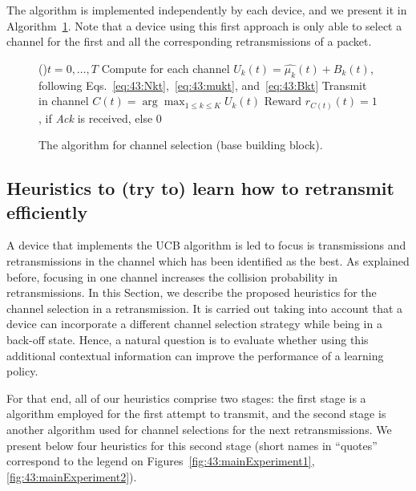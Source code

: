 The \UCB{} algorithm is implemented independently by each device, and we present it in Algorithm~\ref{algo:43:UCB}.
Note that a device using this first approach is only able to select a channel for the first and all the corresponding retransmissions of a packet.

\begin{figure}[h!]
	\centering
	\begin{algorithm}[H]
		\For(){$t = 0, \dots, T$}{
			Compute for each channel $ U_k(t) = \widehat{\mu_k}(t) + B_k(t)$, following Eqs.~\eqref{eq:43:Nkt},~\eqref{eq:43:mukt}, and~\eqref{eq:43:Bkt}\;
			Transmit in channel $C(t) = \arg\max_{1\leq k \leq K} U_k(t)$\;
			Reward $r_{C(t)}(t) = 1$, if \emph{Ack} is received, else $0$\;
		}
		\caption{The \UCB{} algorithm for channel selection (base building block).}
		\label{algo:43:UCB}
	\end{algorithm}
\end{figure}


\subsection{Heuristics to (try to) learn how to retransmit efficiently}
\label{sub:43:heuristics}

A device that implements the UCB algorithm is led to focus is transmissions and retransmissions in the channel which has been identified as the best.
As explained before, focusing in one channel increases the collision probability in retransmissions.
In this Section, we describe the proposed heuristics for the channel selection in a retransmission. It is carried out taking
into account that a device can incorporate a different channel selection strategy while being in a back-off state.
Hence, a natural question is to evaluate whether using this additional contextual information can improve the performance of a learning policy.

For that end, all of our heuristics comprise two stages:
the first stage is a \UCB{} algorithm employed for the first attempt to transmit,
and the second stage is another algorithm used for channel selections for the next retransmissions.
%
We present below four heuristics for this second stage (short names in ``quotes'' correspond to the legend on Figures~\ref{fig:43:mainExperiment1}, \ref{fig:43:mainExperiment2}).


